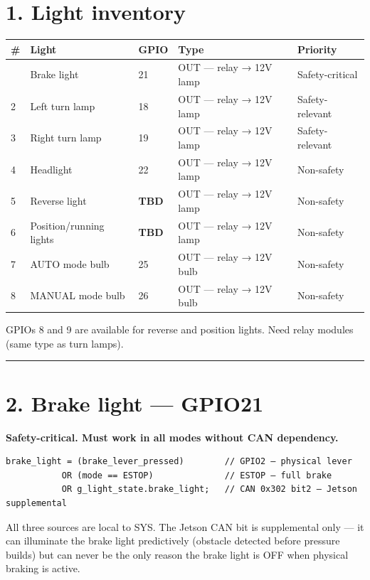 \documentclass[12pt,a4paper,oneside]{report}
\begin{document}
\section{1. Light inventory}\label{light-inventory}

\begin{longtable}[]{@{}lllll@{}}
\toprule\noalign{}
\# & Light & GPIO & Type & Priority \\
\midrule\noalign{}
\endhead
\bottomrule\noalign{}
\endlastfoot
1 & Brake light & 21 & OUT --- relay → 12V lamp & Safety-critical \\
2 & Left turn lamp & 18 & OUT --- relay → 12V lamp & Safety-relevant \\
3 & Right turn lamp & 19 & OUT --- relay → 12V lamp & Safety-relevant \\
4 & Headlight & 22 & OUT --- relay → 12V lamp & Non-safety \\
5 & Reverse light & \textbf{TBD} & OUT --- relay → 12V lamp & Non-safety \\
6 & Position/running lights & \textbf{TBD} & OUT --- relay → 12V lamp &
Non-safety \\
7 & AUTO mode bulb & 25 & OUT --- relay → 12V bulb & Non-safety \\
8 & MANUAL mode bulb & 26 & OUT --- relay → 12V bulb & Non-safety \\
\end{longtable}

GPIOs 8 and 9 are available for reverse and position lights. Need relay modules
(same type as turn lamps).

\begin{center}\rule{0.5\linewidth}{0.5pt}\end{center}

\section{2. Brake light --- GPIO21}\label{brake-light-gpio21}

\textbf{Safety-critical. Must work in all modes without CAN dependency.}

\begin{verbatim}
brake_light = (brake_lever_pressed)        // GPIO2 — physical lever
           OR (mode == ESTOP)              // ESTOP — full brake
           OR g_light_state.brake_light;   // CAN 0x302 bit2 — Jetson supplemental
\end{verbatim}

All three sources are local to SYS. The Jetson CAN bit is supplemental only ---
it can illuminate the brake light predictively (obstacle detected before
pressure builds) but can never be the only reason the brake light is OFF when
physical braking is active.
\end{document}
